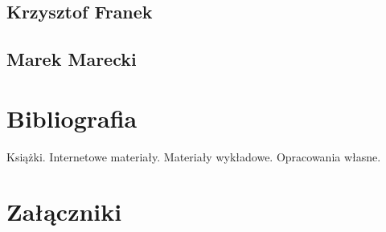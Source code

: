\documentclass[11pt,oneside,a4paper,titlepage,onecolumn]{book}
\begin{document}
\section{Krzysztof Franek}

\section{Marek Marecki}

\chapter{Bibliografia}

Książki. Internetowe materiały. Materiały wykładowe. Opracowania własne.

\chapter{Załączniki}
\end{document}
